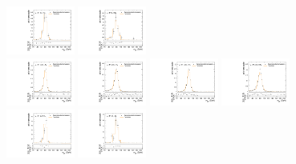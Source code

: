\begin{figure}[htpb]
  \includegraphics[width=0.2\textwidth]{fig/analysisAppendix/templateVsReco_ZprToWW2000_r0_MJ_mu_HP_bb_HDy.pdf}
  \includegraphics[width=0.2\textwidth]{fig/analysisAppendix/templateVsReco_ZprToWW2000_r0_MJ_mu_LP_bb_HDy.pdf}\\
  \includegraphics[width=0.2\textwidth]{fig/analysisAppendix/templateVsReco_ZprToWW2000_r0_MJ_mu_HP_nobb_LDy.pdf}
  \includegraphics[width=0.2\textwidth]{fig/analysisAppendix/templateVsReco_ZprToWW2000_r0_MJ_mu_LP_nobb_LDy.pdf}
  \includegraphics[width=0.2\textwidth]{fig/analysisAppendix/templateVsReco_ZprToWW2000_r0_MJ_mu_HP_nobb_HDy.pdf}
  \includegraphics[width=0.2\textwidth]{fig/analysisAppendix/templateVsReco_ZprToWW2000_r0_MJ_mu_LP_nobb_HDy.pdf}\\
  \includegraphics[width=0.2\textwidth]{fig/analysisAppendix/templateVsReco_ZprToWW2000_r0_MJ_mu_HP_vbf_LDy.pdf}
  \includegraphics[width=0.2\textwidth]{fig/analysisAppendix/templateVsReco_ZprToWW2000_r0_MJ_mu_LP_vbf_LDy.pdf}

\end{figure}
